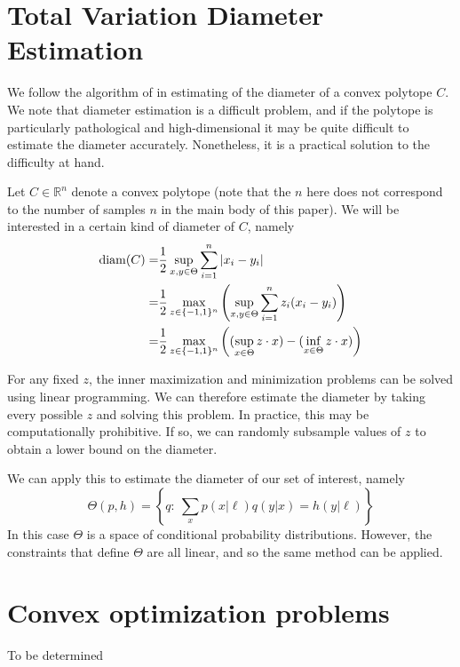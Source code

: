 \section{Total Variation Diameter Estimation}

\label{sec:diameterestimation}

We follow the algorithm of \cite{brieden2001deterministic} in estimating of the diameter of a convex polytope $C$.  We note that diameter estimation is a difficult problem, and if the polytope is particularly pathological and high-dimensional it may be quite difficult to estimate the diameter accurately.  Nonetheless, it is a practical solution to the difficulty at hand.  

Let $C \in \mathbb{R}^{n}$ denote a convex polytope (note that the $n$ here does not correspond to the number of samples $n$ in the main body of this paper).  We will be interested in a certain kind of diameter of $C$, namely
\begin{align*}
\operatorname*{diam}(C) =& \frac{1}{2}\sup_{x,y\in\Theta} \sum_{i=1}^n |x_i-y_i| \\
              =& \frac{1}{2}\max_{z\in\{-1,1\}^n} \left(\sup_{x,y\in\Theta} \sum_{i=1}^n z_i(x_i-y_i)\right)\\
              =& \frac{1}{2}\max_{z\in\{-1,1\}^n} \left((\sup_{x\in\Theta} z \cdot x) - (\inf_{x\in\Theta} z \cdot x) \right)
\end{align*}

For any fixed $z$, the inner maximization and minimization problems can be solved using linear programming.  We can therefore estimate the diameter by taking every possible $z$ and solving this problem.  In practice, this may be computationally prohibitive.  If so, we can randomly subsample values of $z$ to obtain a lower bound on the diameter.

We can apply this to estimate the diameter of our set of interest, namely
\[
\Theta(p,h) = \left\{q:\ \sum_x p(x|\ell)q(y|x)=h(y|\ell)\right\}
\]
In this case $\Theta$ is a space of conditional probability distributions.  However, the constraints that define $\Theta$ are all linear, and so the same method can be applied.

\section{Convex optimization problems}

\label{sec:convexopt}

To be determined

